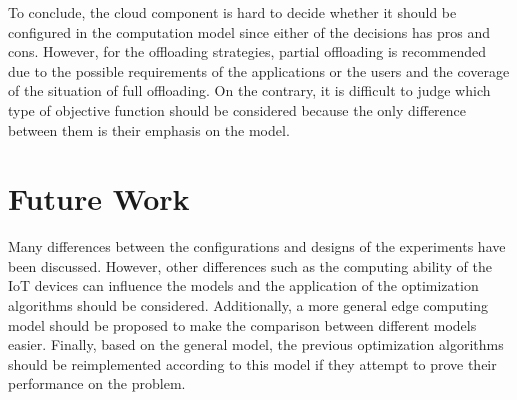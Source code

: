 \documentclass[a4paper,11pt]{article}
\begin{document}
To conclude, the cloud component is hard to decide whether it should be configured in the computation model since either of the decisions has pros and cons. However, for the offloading strategies, partial offloading is recommended due to the possible requirements of the applications or the users and the coverage of the situation of full offloading. On the contrary, it is difficult to judge which type of objective function should be considered because the only difference between them is their emphasis on the model. 

\section{Future Work}
Many differences between the configurations and designs of the experiments have been discussed. However, other differences such as the computing ability of the IoT devices can influence the models and the application of the optimization algorithms should be considered. Additionally, a more general edge computing model should be proposed to make the comparison between different models easier. Finally, based on the general model, the previous optimization algorithms should be reimplemented according to this model if they attempt to prove their performance on the problem. 



\small
\end{document}
